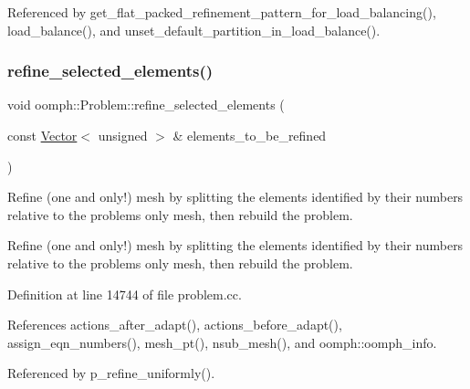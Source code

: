 Referenced by get\+\_\+flat\+\_\+packed\+\_\+refinement\+\_\+pattern\+\_\+for\+\_\+load\+\_\+balancing(), load\+\_\+balance(), and unset\+\_\+default\+\_\+partition\+\_\+in\+\_\+load\+\_\+balance().

\mbox{\label{classoomph_1_1Problem_a88bfce034f5b054e78a1c1a15d196aeb}} 
\subsubsection{\texorpdfstring{refine\+\_\+selected\+\_\+elements()}{refine\_selected\_elements()}\hspace{0.1cm}{\footnotesize\ttfamily [1/6]}}
{\footnotesize\ttfamily void oomph\+::\+Problem\+::refine\+\_\+selected\+\_\+elements (\begin{DoxyParamCaption}\item[{const \hyperlink{classoomph_1_1Vector}{Vector}$<$ unsigned $>$ \&}]{elements\+\_\+to\+\_\+be\+\_\+refined }\end{DoxyParamCaption})}



Refine (one and only!) mesh by splitting the elements identified by their numbers relative to the problems\textquotesingle{} only mesh, then rebuild the problem. 

Refine (one and only!) mesh by splitting the elements identified by their numbers relative to the problems\textquotesingle{} only mesh, then rebuild the problem. 

Definition at line 14744 of file problem.\+cc.



References actions\+\_\+after\+\_\+adapt(), actions\+\_\+before\+\_\+adapt(), assign\+\_\+eqn\+\_\+numbers(), mesh\+\_\+pt(), nsub\+\_\+mesh(), and oomph\+::oomph\+\_\+info.



Referenced by p\+\_\+refine\+\_\+uniformly().

\mbox{\label{classoomph_1_1Problem_a986b77123d4bb4e4d2fd94aacd627a83}} 
